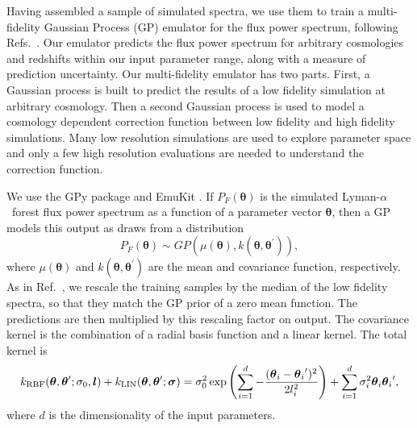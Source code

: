 \documentclass[a4paper,11pt]{article}
\newcommand{\Lya}{Lyman-$\alpha$}
\begin{document}
Having assembled a sample of simulated spectra, we use them to train a multi-fidelity Gaussian Process (GP) emulator for the flux power spectrum, following Refs.~\cite{Bird:2019,Ho:2022, Fernandez:2022}. Our emulator predicts the flux power spectrum for arbitrary cosmologies and redshifts within our input parameter range, along with a measure of prediction uncertainty. Our multi-fidelity emulator has two parts. First, a Gaussian process is built to predict the results of a low fidelity simulation at arbitrary cosmology. Then a second Gaussian process is used to model a cosmology dependent correction function between low fidelity and high fidelity simulations. Many low resolution simulations are used to explore parameter space and only a few high resolution evaluations are needed to understand the correction function.


We use the GPy package \cite{gpy2014} and EmuKit \cite{2021arXiv211013293P}. If $P_F(\boldsymbol{\theta})$ is the simulated \Lya~forest flux power spectrum as a function of a parameter vector $\boldsymbol{\theta}$, then a GP models this output as draws from a distribution
\begin{equation}
    P_F(\boldsymbol{\theta}) \sim GP(\mu(\boldsymbol{\theta}), k(\boldsymbol{\theta}, \boldsymbol{\theta}^{\prime})),
\end{equation}
where $\mu(\boldsymbol{\theta})$ and $k(\boldsymbol{\theta}, \boldsymbol{\theta}^{\prime})$ are the mean and covariance function, respectively.
As in Ref.~\cite{Fernandez:2022}, we rescale the training samples by the median of the low fidelity spectra, so that they match the GP prior of a zero mean function. The predictions are then multiplied by this rescaling factor on output. The covariance kernel is the combination of a radial basis function and a linear kernel. The total kernel is
\begin{equation}
        k_\mathrm{RBF}(\boldsymbol{\theta}, \boldsymbol{\theta}'; \sigma_0, \boldsymbol{l}) + k_\mathrm{LIN}(\boldsymbol{\theta}, \boldsymbol{\theta}'; \boldsymbol{\sigma})\\
        = \sigma_0^2 \exp{\left( \sum_{i=1}^{d} -\frac{(\boldsymbol{\theta}_i - {\boldsymbol{\theta}_i}')^2}{2 l_i^2} \right)} +  \sum_{i=1}^{d} \sigma_i^2 \boldsymbol{\theta}_i {\boldsymbol{\theta}_i}',
        \label{eq:kernel}
\end{equation}
where $d$ is the dimensionality of the input parameters.
\end{document}
